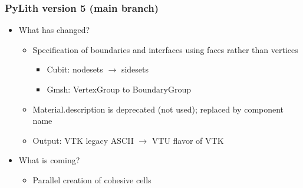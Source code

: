 \documentclass[aspectratio=169]{beamer}
\begin{document}
\begin{frame}

  
\end{frame}


\begin{frame}
  \frametitle{PyLith version 5 (main branch)}
  \summary{}
  
  \begin{itemize}
  \item What has changed?
    \begin{itemize}
    \item Specification of boundaries and interfaces using faces rather than vertices
      \begin{itemize}
      \item Cubit: nodesets $\rightarrow$ sidesets
      \item Gmsh: {\ttfamily VertexGroup} to {\ttfamily BoundaryGroup}
      \end{itemize}
    \item Material.description is deprecated (not used); replaced by component name
    \item Output: VTK legacy ASCII $\rightarrow$ VTU flavor of VTK
    \end{itemize}
  \item What is coming?
    \begin{itemize}
    \item Parallel creation of cohesive cells
    \end{itemize}
  \end{itemize}
  
\end{frame}
\end{document}

